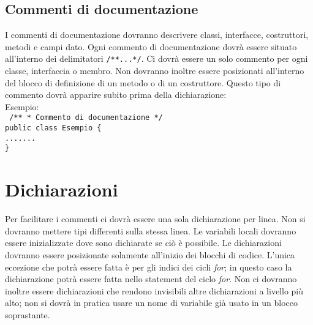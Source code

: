 \subsection{Commenti di documentazione}
I commenti di documentazione dovranno descrivere classi, interfacce, costruttori, metodi e campi dato. Ogni commento di documentazione dovr\`a essere situato all'interno dei delimitatori \texttt{/**...*/}. Ci dovr\`a essere un solo commento per ogni classe, interfaccia o membro. Non dovranno inoltre essere posizionati all'interno del blocco di definizione di un metodo o di un costruttore. Questo tipo di commento dovr\`a apparire subito prima della dichiarazione:\\
 \newline
Esempio:\\
 \newline
\texttt{
	/** \newline
	* Commento di documentazione \newline
	*/ \\
	public class Esempio \{ \\
	\phantom{....}....... \\
	\}
	\\
}
 \newline
\section{Dichiarazioni}
Per facilitare i commenti ci dovr\`a essere una sola dichiarazione per linea. Non si dovranno mettere tipi differenti sulla stessa linea. Le variabili locali dovranno essere inizializzate dove sono dichiarate se ci\`o \`e possibile. Le dichiarazioni dovranno essere posizionate solamente all'inizio dei blocchi di codice. L'unica eccezione che potr\`a essere fatta è per gli indici dei cicli \textit{for}; in questo caso la dichiarazione potr\`a essere fatta nello statement del ciclo \textit{for}. Non ci dovranno inoltre essere dichiarazioni che rendono invisibili altre dichiarazioni a livello pi\`u alto; non si dovr\`a in pratica usare un nome di variabile gi\`a usato in un blocco soprastante.
